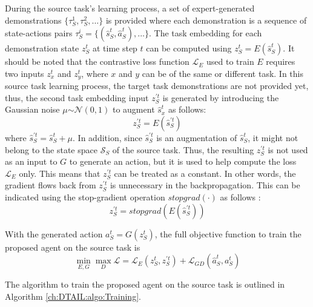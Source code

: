 During the source task's learning process,
a set of expert-generated demonstrations $\{ \tau^1_S, \tau^2_S,... \}$ is provided where each demonstration is a sequence of state-actions pairs $\tau^i_S = \{ (\hat{s}^t_S, \hat{a}^t_S),... \}$.
The task embedding for each demonstration state $z^t_S$ at time step $t$ can be computed using $z^t_S = E(\hat{s}^t_S)$.
It should be noted that the contrastive loss function $\mathcal{L}_E$ used to train $E$ requires two inputs $z^t_x$ and $z^t_y$, where $x$ and $y$ can be of the same or different task.
In this source task learning process,
the target task demonstrations are not provided yet,
thus,
the second task embedding input $z^{\prime t}_S$ is generated by introducing the Gaussian noise $\mu$$\sim$$\mathcal{N}(0, 1)$ to augment $\hat{s}^t_x$ as follows:
    \begin{equation}
      z^{\prime t}_S = E(\hat{s}^{\prime t}_S)
    \end{equation}
    where $\hat{s}^{\prime t}_S = \hat{s}^t_S + \mu$.
    In addition,
    since $\hat{s}^{\prime t}_S$ is an augmentation of $\hat{s}^t_S$,
    it might not belong to the state space $\mathcal{S}_S$ of the source task.
    Thus,
    the resulting $z^{\prime  t}_S$ is not used as an input to $G$ to generate an action, but it is used to help compute the loss $\mathcal{L}_E$ only.
    This means that $z^{\prime  t}_S$ can be treated as a constant.
    In other words,
    the gradient flows back from $z^{\prime  t}_S$ is unnecessary in the backpropagation.
    This can be indicated using the stop-gradient operation $stopgrad(\cdot)$ as follows \cite{CL_Stopgrad_1, CL_Stopgrad_2}:
    \begin{equation}
      z^{\prime t}_S = stopgrad(E(\hat{s}^{\prime t}_S))
    \end{equation}


    With the generated action $a^t_S = G(z^t_S)$,
    the full objective function to train the proposed agent on the source task is
    \begin{equation}
      \min_{E, G}\max_{D}\mathcal{L} = \mathcal{L}_E(z^t_S, z^{\prime t}_S) + \mathcal{L}_{GD}(\hat{a}^t_S, a^t_S)
    \end{equation}

    The algorithm to train the proposed agent on the source task is outlined in Algorithm \ref{ch:DTAIL:algo:Training}.


